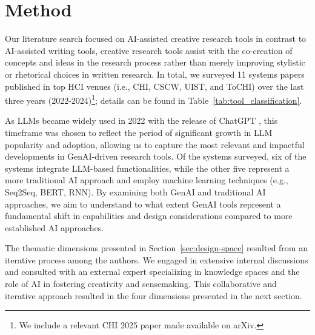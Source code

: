 \section{Method}

Our literature search focused on AI-assisted creative research tools in contrast to AI-assisted writing tools, creative research tools assist with the co-creation of concepts and ideas in the research process rather than merely improving stylistic or rhetorical choices in written research. In total, we surveyed 11 systems papers published in top HCI venues (i.e., CHI, CSCW, UIST, and ToCHI) over the last three years (2022-2024)\footnote{We include a relevant CHI 2025 paper made available on arXiv.}; details can be found in Table~\ref{tab:tool_classification}. 

As LLMs became widely used in 2022 with the release of ChatGPT \cite{openai2022chatgpt}, this timeframe was chosen to reflect the period of significant growth in LLM popularity and adoption, allowing us to capture the most relevant and impactful developments in GenAI-driven research tools. Of the systems surveyed, six of the systems integrate LLM-based functionalities, while the other five represent a more traditional AI approach and employ machine learning techniques (e.g., Seq2Seq, BERT, RNN). By examining both GenAI and traditional AI approaches, we aim to understand to what extent GenAI tools represent a fundamental shift in capabilities and design considerations compared to more established AI approaches.

The thematic dimensions presented in Section~\ref{sec:design-space} resulted from an iterative process among the authors. We engaged in extensive internal discussions and consulted with an external expert specializing in knowledge spaces and the role of AI in fostering creativity and sensemaking. This collaborative and iterative approach resulted in the four dimensions presented in the next section.